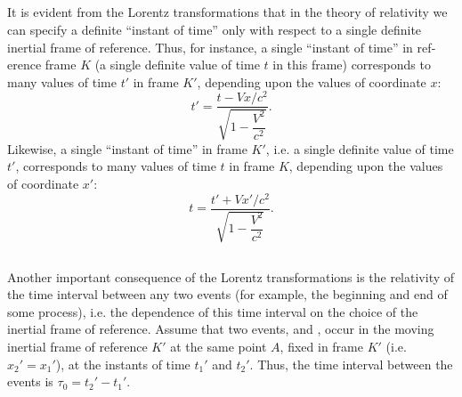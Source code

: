 \subsection{}\label{5.4.3} It is evident from the Lorentz transformations that in the theory of relativity we can specify a definite ``instant of time'' only with respect to a single definite inertial frame of reference. Thus, for instance, a single ``instant of time'' in ref­erence frame $K$ (a single definite value of time $t$ in this frame) corresponds to many values of time $t'$ in frame $K'$, depending upon the values of coordinate $x$:
\begin{equation*}%
t' = \frac{t - Vx/c^{2}}{\sqrt{1 - \dfrac{V^{2}}{c^{2}}}}.
\end{equation*}
Likewise, a single ``instant of time'' in frame $K'$, i.e. a single definite value of time $t'$, corresponds to many values of time $t$ in frame $K$, depending upon the values of coordinate $x'$:
\begin{equation*}%
t = \frac{t' +  Vx'/c^{2}}{\sqrt{1 - \dfrac{V^{2}}{c^{2}}}}.
\end{equation*}


\subsection{}\label{5.4.4} Another important consequence of the Lorentz transformations is the relativity of the time interval between any two events (for example, the beginning and end of some process), i.e. the dependence of this time interval on the choice of the inertial frame of reference. Assume that two events,  and , occur in the moving inertial frame of reference $K'$ at the same point $A$, fixed in frame $K'$ (i.e. $x_{2}'= x_{1}'$), at the instants of time $t_{1}'$ and $t_{2}'$. Thus, the time interval between the events is $\tau_{0}=  t_{2}'- t_{1}'$.

